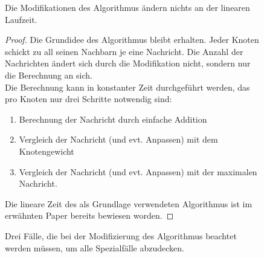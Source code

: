 \begin{figure}[h]
	\hfill
	\hfill
	
	\caption{Drei Fälle, die bei der Modifizierung des Algorithmus beachtet werden müssen, um alle Spezialfälle abzudecken.} 
	
	
	\begin{theorem}
		Die Modifikationen des Algorithmus ändern nichts an der linearen Laufzeit.
	\end{theorem}
	\begin{proof}
		Die Grundidee des Algorithmus bleibt erhalten. Jeder Knoten schickt zu all seinen Nachbarn je eine Nachricht. Die Anzahl der Nachrichten ändert sich durch die Modifikation nicht, sondern nur die Berechnung an sich.\\Die Berechnung kann in konstanter Zeit durchgeführt werden, das pro Knoten nur drei Schritte notwendig sind:
		\begin{enumerate}
			\item Berechnung der Nachricht durch einfache Addition
			\item Vergleich der Nachricht (und evt. Anpassen) mit dem Knotengewicht
			\item Vergleich der Nachricht (und evt. Anpassen) mit der maximalen Nachricht.
		\end{enumerate}
		Die lineare Zeit des als Grundlage verwendeten Algorithmus ist im erwähnten Paper bereits bewiesen worden.
	\end{proof}
\end{figure} 



